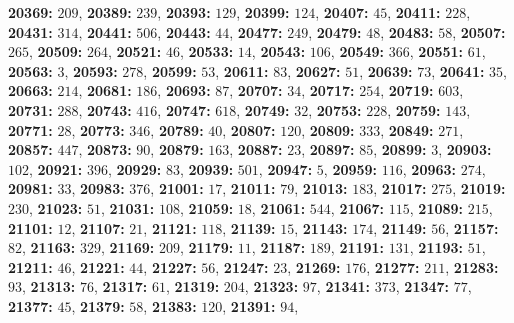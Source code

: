 \textsf{\bfseries 20369:} $209$, \textsf{\bfseries 20389:} $239$, \textsf{\bfseries 20393:} $129$, \textsf{\bfseries 20399:} $124$, \textsf{\bfseries 20407:} $45$, \textsf{\bfseries 20411:} $228$, \textsf{\bfseries 20431:} $314$, \textsf{\bfseries 20441:} $506$, \textsf{\bfseries 20443:} $44$, \textsf{\bfseries 20477:} $249$, \textsf{\bfseries 20479:} $48$, \textsf{\bfseries 20483:} $58$, \textsf{\bfseries 20507:} $265$, \textsf{\bfseries 20509:} $264$, \textsf{\bfseries 20521:} $46$, \textsf{\bfseries 20533:} $14$, \textsf{\bfseries 20543:} $106$, \textsf{\bfseries 20549:} $366$, \textsf{\bfseries 20551:} $61$, \textsf{\bfseries 20563:} $3$, \textsf{\bfseries 20593:} $278$, \textsf{\bfseries 20599:} $53$, \textsf{\bfseries 20611:} $83$, \textsf{\bfseries 20627:} $51$, \textsf{\bfseries 20639:} $73$, \textsf{\bfseries 20641:} $35$, \textsf{\bfseries 20663:} $214$, \textsf{\bfseries 20681:} $186$, \textsf{\bfseries 20693:} $87$, \textsf{\bfseries 20707:} $34$, \textsf{\bfseries 20717:} $254$, \textsf{\bfseries 20719:} $603$, \textsf{\bfseries 20731:} $288$, \textsf{\bfseries 20743:} $416$, \textsf{\bfseries 20747:} $618$, \textsf{\bfseries 20749:} $32$, \textsf{\bfseries 20753:} $228$, \textsf{\bfseries 20759:} $143$, \textsf{\bfseries 20771:} $28$, \textsf{\bfseries 20773:} $346$, \textsf{\bfseries 20789:} $40$, \textsf{\bfseries 20807:} $120$, \textsf{\bfseries 20809:} $333$, \textsf{\bfseries 20849:} $271$, \textsf{\bfseries 20857:} $447$, \textsf{\bfseries 20873:} $90$, \textsf{\bfseries 20879:} $163$, \textsf{\bfseries 20887:} $23$, \textsf{\bfseries 20897:} $85$, \textsf{\bfseries 20899:} $3$, \textsf{\bfseries 20903:} $102$, \textsf{\bfseries 20921:} $396$, \textsf{\bfseries 20929:} $83$, \textsf{\bfseries 20939:} $501$, \textsf{\bfseries 20947:} $5$, \textsf{\bfseries 20959:} $116$, \textsf{\bfseries 20963:} $274$, \textsf{\bfseries 20981:} $33$, \textsf{\bfseries 20983:} $376$, \textsf{\bfseries 21001:} $17$, \textsf{\bfseries 21011:} $79$, \textsf{\bfseries 21013:} $183$, \textsf{\bfseries 21017:} $275$, \textsf{\bfseries 21019:} $230$, \textsf{\bfseries 21023:} $51$, \textsf{\bfseries 21031:} $108$, \textsf{\bfseries 21059:} $18$, \textsf{\bfseries 21061:} $544$, \textsf{\bfseries 21067:} $115$, \textsf{\bfseries 21089:} $215$, \textsf{\bfseries 21101:} $12$, \textsf{\bfseries 21107:} $21$, \textsf{\bfseries 21121:} $118$, \textsf{\bfseries 21139:} $15$, \textsf{\bfseries 21143:} $174$, \textsf{\bfseries 21149:} $56$, \textsf{\bfseries 21157:} $82$, \textsf{\bfseries 21163:} $329$, \textsf{\bfseries 21169:} $209$, \textsf{\bfseries 21179:} $11$, \textsf{\bfseries 21187:} $189$, \textsf{\bfseries 21191:} $131$, \textsf{\bfseries 21193:} $51$, \textsf{\bfseries 21211:} $46$, \textsf{\bfseries 21221:} $44$, \textsf{\bfseries 21227:} $56$, \textsf{\bfseries 21247:} $23$, \textsf{\bfseries 21269:} $176$, \textsf{\bfseries 21277:} $211$, \textsf{\bfseries 21283:} $93$, \textsf{\bfseries 21313:} $76$, \textsf{\bfseries 21317:} $61$, \textsf{\bfseries 21319:} $204$, \textsf{\bfseries 21323:} $97$, \textsf{\bfseries 21341:} $373$, \textsf{\bfseries 21347:} $77$, \textsf{\bfseries 21377:} $45$, \textsf{\bfseries 21379:} $58$, \textsf{\bfseries 21383:} $120$, \textsf{\bfseries 21391:} $94$, 
